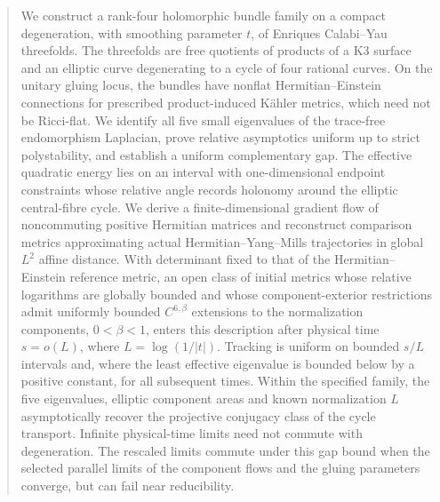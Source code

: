 

\begin{abstract}
We construct a rank-four holomorphic bundle family on a compact
degeneration, with smoothing parameter $t$, of Enriques Calabi--Yau
threefolds. The threefolds are free quotients of products of a K3
surface and an elliptic curve degenerating to a cycle of four rational
curves. On the unitary gluing locus, the bundles have nonflat
Hermitian--Einstein connections for prescribed product-induced
K\"ahler metrics, which need not be Ricci-flat. We identify all five
small eigenvalues of the trace-free endomorphism Laplacian, prove
relative asymptotics uniform up to strict polystability, and establish
a uniform complementary gap. The effective quadratic energy lies on
an interval with one-dimensional endpoint constraints whose relative
angle records holonomy around the elliptic central-fibre cycle.
We derive a finite-dimensional gradient flow of noncommuting positive Hermitian
matrices and reconstruct comparison metrics approximating actual Hermitian--Yang--Mills
trajectories in global $L^2$ affine distance.
With determinant fixed to that of the Hermitian--Einstein reference metric,
an open class of initial metrics whose relative logarithms are globally
bounded and whose component-exterior restrictions admit uniformly bounded
$C^{6,\beta}$ extensions to the normalization components,
$0<\beta<1$, enters this description after physical time $s=o(L)$,
where $L=\log(1/|t|)$. Tracking is uniform on bounded $s/L$ intervals
and, where the least effective eigenvalue is bounded below by a
positive constant, for all subsequent times. Within the specified
family, the five eigenvalues, elliptic component areas and known
normalization $L$ asymptotically recover the projective conjugacy
class of the cycle transport. Infinite physical-time limits need not
commute with degeneration. The rescaled limits commute under this
gap bound when the selected parallel limits of the component flows
and the gluing parameters converge, but can fail near reducibility.
\end{abstract}
\maketitle











